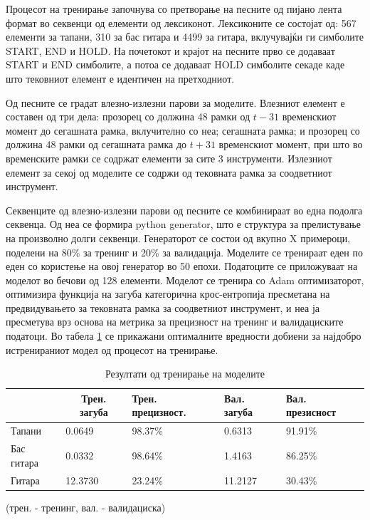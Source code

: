 Процесот на тренирање започнува со претворање на песните од пијано лента формат во секвенци од елементи од лексиконот. Лексиконите се состојат од: 567 елементи за тапани, 310 за бас гитара и 4499 за гитара, вклучувајќи ги симболите START, END и HOLD. На почетокот и крајот на песните прво се додаваат  START и END симболите, а потоа се додаваат HOLD симболите секаде каде што тековниот елемент е идентичен на претходниот. 

Од песните се градат влезно-излезни парови за моделите. Влезниот елемент е составен од три дела: прозорец со должина 48 рамки од $t-31$ временскиот момент до сегашната рамка, вклучително со неа; сегашната рамка; и прозорец со должина 48 рамки од сегашната рамка до $t+31$ временскиот момент, при што во временските рамки се содржат елементи за сите 3 инструменти. Излезниот елемент за секој од моделите се содржи од тековната рамка за соодветниот инструмент.

Секвенците од влезно-излезни парови од песните се комбинираат во една подолга секвенца. Од неа се формира python generator, што е структура за прелистување на произволно долги секвенци. Генераторот се состои од вкупно X примероци, поделени на 80\% за тренинг и 20\% за валидација. Моделите се тренираат еден по еден со користење на овој генератор во 50 епохи. Податоците се приложуваат на моделот во бечови од 128 елементи. Моделот се тренира со Adam оптимизаторот, оптимизира функција на загуба категорична крос-ентропија пресметана на предвидувањето за тековната рамка за соодветниот инструмент, и неа ја пресметува врз основа на метрика за прецизност на тренинг и валидациските податоци. Во табела \ref{tab:trening} се прикажани оптималните вредности добиени за најдобро истренираниот модел од процесот на тренирање.

\begin{table}[H]
\centering
\begin{tabular}{@{}lllll@{}}
\toprule
           & \multicolumn{1}{c}{Трен. загуба} & Трен. прецизност. & Вал. загуба & Вал. презисност                   \\ \midrule
Тапани          &   0.0649              &  98.37\%              &  0.6313               &    91.91\%    \\
Бас гитара      &   0.0332              &  98.64\%              &  1.4163               &    86.25\%    \\
Гитара          &   12.3730             &  23.24\%              &  11.2127              &    30.43\%    \\ \bottomrule
\end{tabular}
\caption{Резултати од тренирање на моделите}
(трен. - тренинг, вал. - валидациска)
\label{tab:trening}
\end{table}

